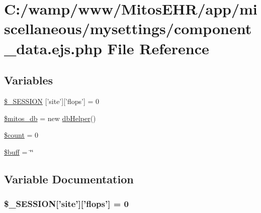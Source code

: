 \hypertarget{miscellaneous_2mysettings_2component__data_8ejs_8php}{\section{\-C\-:/wamp/www/\-Mitos\-E\-H\-R/app/miscellaneous/mysettings/component\-\_\-data.ejs.\-php \-File \-Reference}
\label{miscellaneous_2mysettings_2component__data_8ejs_8php}
}
\subsection*{\-Variables}
\begin{DoxyCompactItemize}
\item 
\hyperlink{miscellaneous_2mysettings_2component__data_8ejs_8php_a99fda8552a3e58235643b79f5af3ded8}{\$\-\_\-\-S\-E\-S\-S\-I\-O\-N} \mbox{[}'site'\mbox{]}\mbox{[}'flops'\mbox{]} = 0
\item 
\hyperlink{miscellaneous_2mysettings_2component__data_8ejs_8php_ab5d961f93efe4e2e8d8374f01dd6c65a}{\$mitos\-\_\-db} = new \hyperlink{classdb_helper}{db\-Helper}()
\item 
\hyperlink{miscellaneous_2mysettings_2component__data_8ejs_8php_af789423037bbc89dc7c850e761177570}{\$count} = 0
\item 
\hyperlink{miscellaneous_2mysettings_2component__data_8ejs_8php_aee88b745b9e14ca8b4227da600cea0b8}{\$buff} = \char`\"{}\char`\"{}
\end{DoxyCompactItemize}


\subsection{\-Variable \-Documentation}
\hypertarget{miscellaneous_2mysettings_2component__data_8ejs_8php_a99fda8552a3e58235643b79f5af3ded8}{
\subsubsection[{\$\-\_\-\-S\-E\-S\-S\-I\-O\-N}]{\setlength{\rightskip}{0pt plus 5cm}\$\-\_\-\-S\-E\-S\-S\-I\-O\-N\mbox{[}'site'\mbox{]}\mbox{[}'flops'\mbox{]} = 0}}\label{miscellaneous_2mysettings_2component__data_8ejs_8php_a99fda8552a3e58235643b79f5af3ded8}


